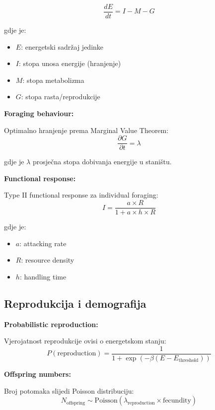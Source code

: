 \documentclass[11pt,oneside]{book}
\begin{document}
\begin{equation}
	\frac{dE}{dt} = I - M - G
\end{equation}

gdje je:
\begin{itemize}
	\item $E$: energetski sadržaj jedinke
	\item $I$: stopa unosa energije (hranjenje)
	\item $M$: stopa metabolizma
	\item $G$: stopa rasta/reprodukcije
\end{itemize}

\textbf{Foraging behaviour:}

Optimalno hranjenje prema Marginal Value Theorem:
\begin{equation}
	\frac{\partial G}{\partial t} = \lambda
\end{equation}

gdje je $\lambda$ prosječna stopa dobivanja energije u staništu.

\textbf{Functional response:}

Type II functional response za individual foraging:
\begin{equation}
	I = \frac{a \times R}{1 + a \times h \times R}
\end{equation}

gdje je:
\begin{itemize}
	\item $a$: attacking rate
	\item $R$: resource density
	\item $h$: handling time
\end{itemize}

\subsection{Reprodukcija i demografija}

\textbf{Probabilistic reproduction:}

Vjerojatnost reprodukcije ovisi o energetskom stanju:
\begin{equation}
	P(\text{reproduction}) = \frac{1}{1 + \exp(-\beta(E - E_{\text{threshold}}))}
\end{equation}

\textbf{Offspring numbers:}

Broj potomaka slijedi Poisson distribuciju:
\begin{equation}
	N_{\text{offspring}} \sim \text{Poisson}(\lambda_{\text{reproduction}} \times \text{fecundity})
\end{equation}
\end{document}

